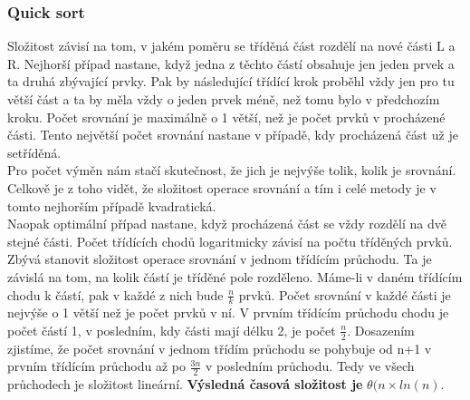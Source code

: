 \documentclass[10pt,a4paper]{article}
\begin{document}
\subsubsection{Quick sort}
Složitost závisí na tom, v jakém poměru se tříděná část rozdělí na nové části L a R. Nejhorší případ nastane, když jedna z těchto částí obsahuje jen jeden prvek a ta druhá zbývající prvky. Pak by následující třídící krok proběhl vždy jen pro tu větší část a ta by měla vždy o jeden prvek méně, než tomu bylo v předchozím kroku. Počet srovnání je maximálně o 1 větší, než je počet prvků v procházené části. Tento největší počet srovnání nastane v případě, kdy procházená část už je setříděná. \\
Pro počet výměn nám stačí skutečnost, že jich je nejvýše tolik, kolik je srovnání. Celkově je z toho vidět, že složitost operace srovnání a tím i celé metody je v tomto nejhorším případě kvadratická. \\
Naopak optimální případ nastane, když procházená část se vždy rozdělí na dvě stejné části. Počet třídících chodů logaritmicky závisí na počtu tříděných prvků. Zbývá stanovit složitost operace srovnání v jednom třídícím průchodu. Ta je závislá na tom, na kolik částí je tříděné pole rozděleno. Máme-li v daném třídícím chodu k částí, pak v každé z nich bude $\frac{n}{k}$ prvků. Počet srovnání v každé části je nejvýše o 1 větší než je počet prvků v ní. V prvním třídícím průchodu chodu je počet částí 1, v posledním, kdy části mají délku 2, je počet $\frac{n}{2}$. Dosazením zjistíme, že počet srovnání v jednom třídím průchodu se pohybuje od n+1 v prvním třídícím průchodu až po $\frac{3n}{2}$ v posledním průchodu. Tedy ve všech průchodech je složitost lineární. \textbf{Výsledná časová složitost je} $\theta (n \times ln(n)$.
\end{document}
